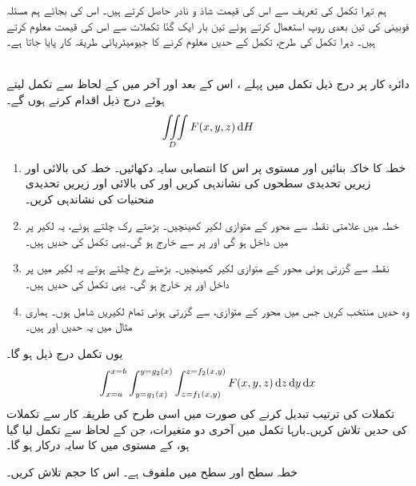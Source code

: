 ہم تہرا تکمل کی تعریف سے اس کی قیمت شاذ و نادر حاصل کرتے ہیں۔ اس کی بجائے ہم مسئلہ فوبینی کی  تین بعدی روپ استعمال کرتے ہوئے تین بار ایک گنّا تکملات سے اس کی قیمت معلوم کرتے ہیں۔ دہرا تکمل کی طرح، تکمل کے حدیں  معلوم کرنے کا جیومیٹریائی طریقہ کار پایا جاتا  ہے۔
 
\\
دائرہ کار  پر درج ذیل تکمل میں  پہلے  ، اس کے بعد  اور آخر میں    کے لحاظ سے تکمل لیتے ہوئے  درج ذیل اقدام کرنے ہوں گے۔
\begin{align*}
\iiint\limits_D F(x,y,z)\dif H
\end{align*}
\begin{enumerate}[1.]
\item
{}\quad
خطہ  کا خاکہ بنائیں اور مستوی  پر  اس کا انتصابی سایہ   دکھائیں۔  خطہ  کی بالائی اور زیریں تحدیدی سطحوں کی نشاندہی کریں اور  کی بالائی اور زیریں تحدیدی منحنیات  کی نشاندہی کریں۔
\item
{}\quad
خطہ  میں  علامتی نقطہ  سے  محور کے متوازی  لکیر  کھینچیں۔  بڑھتے   رک چلتے ہوئے،  یہ لکیر  پر  میں داخل ہو گی اور   پر  سے خارج ہو گی۔یہی تکمل کی   حدیں ہیں۔
\item
{}\quad
 نقطہ  سے گزرتی ہوئی   محور کے متوازی  لکیر  کھینچیں۔ بڑھتے  رخ چلتے ہوئے  یہ لکیر  میں  پر داخل اور  پر خارج ہو گی۔ یہی تکمل کی  حدیں ہیں۔
\item
{}\quad
وہ  حدیں منتخب کریں جس میں  محور  کے متوازی،   سے گزرتی ہوئی تمام لکیریں    شامل ہوں۔ ہماری مثال میں  یہ حدیں   اور  ہیں۔
\end{enumerate}
یوں تکمل درج ذیل ہو گا۔
\begin{align*}
\int_{x=a}^{x=b}\int_{y=g_1(x)}^{y=g_2(x)}\int_{z=f_1(x,y)}^{z=f_2(x,y)}F(x,y,z)\dif z\dif y\dif x
\end{align*}
تکملات کی ترتیب  تبدیل کرنے کی صورت میں اسی طرح کی طریقہ کار سے تکملات کی حدیں تلاش کریں۔بارہا تکمل میں آخری دو متغیرات،  جن کے لحاظ سے تکمل لیا  گیا ہو، کے مستوی میں  کا سایہ درکار ہو گا۔


خطہ  سطح  اور سطح  میں  ملفوف ہے۔ اس کا حجم تلاش کریں۔

